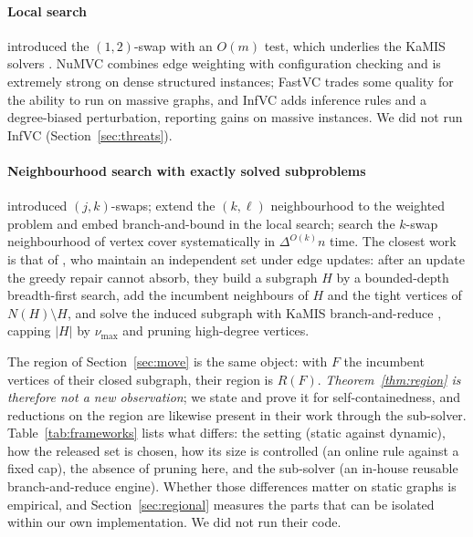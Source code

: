 \documentclass[review,authoryear,11pt]{elsarticle}
\theoremstyle{definition}
\begin{document}
\paragraph{Local search} \citet{andrade2012} introduced the $(1,2)$-swap with an
$O(m)$ test, which underlies the KaMIS solvers \citep{lamm2017,dahlum2016}. NuMVC
\citep{cai2013numvc} combines edge weighting with configuration checking and is
extremely strong on dense structured instances; FastVC
\citep{cai2015,cai2017fastvc} trades some quality for the ability to run on massive
graphs, and InfVC \citep{sun2025infvc} adds inference rules and a degree-biased
perturbation, reporting gains on massive instances. We did not run InfVC
(Section~\ref{sec:threats}).

\paragraph{Neighbourhood search with exactly solved subproblems}
\citet{andrade2012} introduced $(j,k)$-swaps; \citet{hashimoto2019} extend the
$(k,\ell)$ neighbourhood to the weighted problem and embed branch-and-bound in the
local search; \citet{katzmann2017} search the $k$-swap neighbourhood of vertex cover
systematically in $\Delta^{O(k)}n$ time. The closest work is that of
\citet{borowitz2025}, who maintain an independent set under edge updates: after an
update the greedy repair cannot absorb, they build a subgraph $H$ by a bounded-depth
breadth-first search, add the incumbent neighbours of $H$ and the tight vertices of
$N(H)\setminus H$, and solve the induced subgraph with KaMIS branch-and-reduce
\citep{lamm2019}, capping $|H|$ by $\nu_{\max}$ and pruning high-degree vertices.

The region of Section~\ref{sec:move} is the same object: with $F$ the incumbent
vertices of their closed subgraph, their region is $R(F)$.
\emph{Theorem~\ref{thm:region} is therefore not a new observation}; we state and
prove it for self-containedness, and reductions on the region are likewise present
in their work through the sub-solver. Table~\ref{tab:frameworks} lists what differs:
the setting (static against dynamic), how the released set is chosen, how its size
is controlled (an online rule against a fixed cap), the absence of pruning here, and
the sub-solver (an in-house reusable branch-and-reduce engine). Whether those
differences matter on static graphs is empirical, and Section~\ref{sec:regional}
measures the parts that can be isolated within our own implementation. We did not
run their code.
\end{document}

